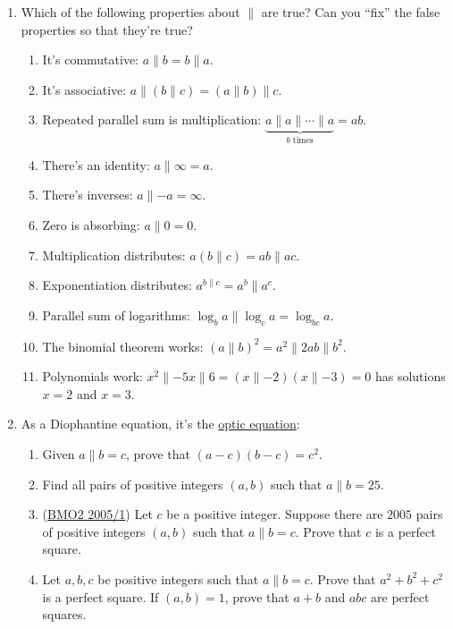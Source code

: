 \documentclass[11pt,paper=letter]{scrartcl}
\newcommand{\pl}{\parallel}
\begin{document}
\begin{enumerate}

\item Which of the following properties about $\pl$ are true? Can you ``fix'' the false properties so that they're true?
\begin{enumerate}[label*=\arabic*]
\item It's commutative: $a \pl b = b \pl a$.
\item It's associative: $a \pl (b \pl c) = (a \pl b) \pl c$.
\item Repeated parallel sum is multiplication: $\underbrace{a \pl a \pl \cdots \pl a}_{b\text{ times}} = ab$.
\item There's an identity: $a \pl \infty = a$.
\item There's inverses: $a \pl -a = \infty$.
\item Zero is absorbing: $a \pl 0 = 0$.
\item Multiplication distributes: $a(b \pl c) = ab \pl ac$.
\item Exponentiation distributes: $a^{b \pl c} = a^b \pl a^c$.
\item Parallel sum of logarithms: $\log_b a \pl \log_c a = \log_{bc} a$.
\item The binomial theorem works: $(a \pl b)^2 = a^2 \pl 2ab \pl b^2$.
\item Polynomials work: $ x^2 \pl -5x \pl 6 = (x \pl -2)(x \pl -3) = 0$ has solutions $x = 2$ and $x = 3$.
\end{enumerate}

\item As a Diophantine equation, it's the \href{https://en.wikipedia.org/wiki/Optic_equation}{optic equation}:
\begin{enumerate}[label*=\arabic*]
\item \label{p:sfft} Given $a \pl b = c$, prove that $(a - c)(b - c) = c^2$.
\item Find all pairs of positive integers $(a, b)$ such that $a \pl b = 25$.
\item (\href{https://bmos.ukmt.org.uk/home/bmo2-2005.pdf}{BMO2 2005/1}) Let $c$ be a positive integer. Suppose there are $2005$ pairs of positive integers $(a, b)$ such that $a \pl b = c$. Prove that $c$ is a perfect square.
\item \label{p:perfect-squares} Let $a, b, c$ be positive integers such that $a \pl b = c$. Prove that $a^2 + b^2 + c^2$ is a perfect square. If $(a, b) = 1$, prove that $a + b$ and $abc$ are perfect squares.
\end{enumerate}


\end{enumerate}
\end{document}
